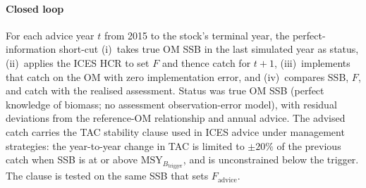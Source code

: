 \documentclass[11pt,a4paper]{article}
\newcommand{\Btrig}{\mathrm{MSY}_{B_{\mathrm{trigger}}}}
\begin{document}
\paragraph{Closed loop}
For each advice year $t$ from 2015 to the stock's terminal year, the
perfect-information short-cut (i)~takes true OM SSB in the last
simulated year as status, (ii)~applies the ICES HCR to set $F$ and thence
catch for $t{+}1$, (iii)~implements that catch on the OM with zero
implementation error, and (iv)~compares SSB, $F$, and catch with the
realised assessment. Status was true OM SSB (perfect knowledge of
biomass; no assessment observation-error model), with residual
deviations from the reference-OM relationship and annual advice. The
advised catch carries the TAC stability clause used in ICES advice under
management strategies: the year-to-year change in TAC is limited to
$\pm20\%$ of the previous catch when SSB is at or above $\Btrig$, and is
unconstrained below the trigger. The clause is tested on the same SSB
that sets $F_{\mathrm{advice}}$.
\end{document}
